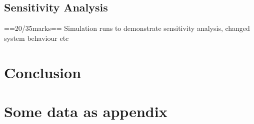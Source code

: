 \documentclass[a4paper,11pt,fleqn]{report}
\begin{document}
\section{Sensitivity Analysis}
==20/35marks==
Simulation runs to demonstrate sensitivity analysis, changed system behaviour etc 

\chapter{Conclusion}
\acresetall
  



\appendix
\chapter{Some data as appendix}
\end{document}
